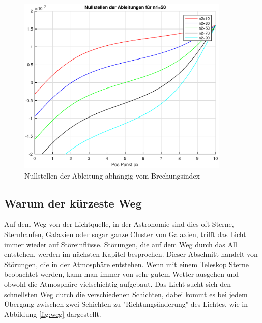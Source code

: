 \begin{refsection}
\begin{figure}
  \centering
  \includegraphics[width=0.9\textwidth]{adaptiv/images/Nullstellen}
  \caption{Nullstellen der Ableitung abhängig vom Brechungsindex}
  \label{fig:nullstelle}
\end{figure}

\subsection{Warum der kürzeste Weg}
Auf dem Weg von der Lichtquelle, in der Astronomie sind dies oft Sterne, Sternhaufen, Galaxien oder sogar ganze Cluster von Galaxien, trifft das Licht immer wieder auf Störeinflüsse. Störungen, die auf dem Weg durch das All entstehen, werden im nächsten Kapitel besprochen. Dieser Abschnitt handelt von Störungen, die in der Atmosphäre entstehen. Wenn mit einem Teleskop Sterne beobachtet werden, kann man immer von sehr gutem Wetter ausgehen und obwohl die Atmosphäre vielschichtig aufgebaut. Das Licht sucht sich den schnellsten Weg durch die verschiedenen Schichten, dabei kommt es bei jedem Übergang zwischen zwei Schichten zu "Richtungsänderung" des Lichtes, wie in Abbildung \ref{fig:weg} dargestellt.


\end{refsection}
